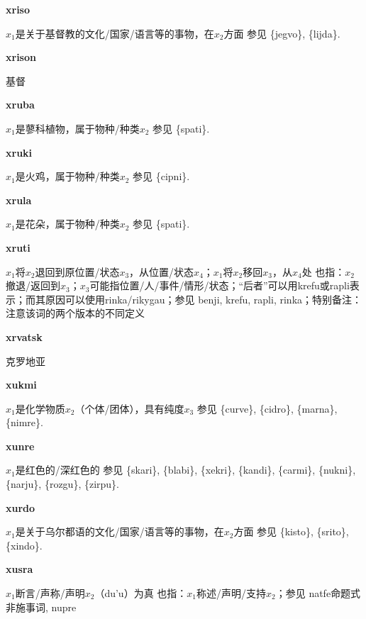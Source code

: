 \documentclass[notitlepage,twocolumn,a4paper,10pt]{book}
\begin{document}
{\sffamily\bfseries xriso}\enspace {\ttfamily\bfseries[xis     xi'o]}  $x_1$是关于基督教的文化\slash{}国家\slash{}语言等的事物，在$x_2$方面 \textemdash{} 参见 \{jegvo\}, \{lijda\}.

{\sffamily\bfseries xrison} 基督

{\sffamily\bfseries xruba}\enspace {\ttfamily\bfseries[xub]}  $x_1$是蓼科植物，属于物种\slash{}种类$x_2$ \textemdash{} 参见 \{spati\}.

{\sffamily\bfseries xruki}\enspace {\ttfamily\bfseries[xuk]}  $x_1$是火鸡，属于物种\slash{}种类$x_2$ \textemdash{} 参见 \{cipni\}.

{\sffamily\bfseries xrula}\enspace {\ttfamily\bfseries[rul]}  $x_1$是花朵，属于物种\slash{}种类$x_2$ \textemdash{} 参见 \{spati\}.

{\sffamily\bfseries xruti}\enspace {\ttfamily\bfseries[    xru]}  $x_1$将$x_2$退回到原位置\slash{}状态$x_3$，从位置\slash{}状态$x_4$；$x_1$将$x_2$移回$x_3$，从$x_4$处 \textemdash{} 也指：$x_2$撤退\slash{}返回到$x_3$；$x_3$可能指位置\slash{}人\slash{}事件\slash{}情形\slash{}状态；“后者”可以用{krefu}或{rapli}表示；而其原因可以使用{rinka}\slash{}{rikygau}；参见 {benji}, {krefu}, {rapli}, {rinka}；特别备注：注意该词的两个版本的不同定义

{\sffamily\bfseries xrvatsk} 克罗地亚

{\sffamily\bfseries xukmi}\enspace {\ttfamily\bfseries[xum     xu'i]}  $x_1$是化学物质$x_2$（个体\slash{}团体），具有纯度$x_3$ \textemdash{} 参见 \{curve\}, \{cidro\}, \{marna\}, \{nimre\}.

{\sffamily\bfseries xunre}\enspace {\ttfamily\bfseries[xun     xu'e]}  $x_1$是红色的\slash{}深红色的 \textemdash{} 参见 \{skari\}, \{blabi\}, \{xekri\}, \{kandi\}, \{carmi\}, \{nukni\}, \{narju\}, \{rozgu\}, \{zirpu\}.

{\sffamily\bfseries xurdo}\enspace {\ttfamily\bfseries[xur     xu'o]}  $x_1$是关于乌尔都语的文化\slash{}国家\slash{}语言等的事物，在$x_2$方面 \textemdash{} 参见 \{kisto\}, \{srito\}, \{xindo\}.

{\sffamily\bfseries xusra}\enspace {\ttfamily\bfseries[xus     xu'a]}  $x_1$断言\slash{}声称\slash{}声明$x_2$（du'u）为真 \textemdash{} 也指：$x_1$称述\slash{}声明\slash{}支持$x_2$；参见 {natfe}命题式非施事词, {nupre}
\end{document}
